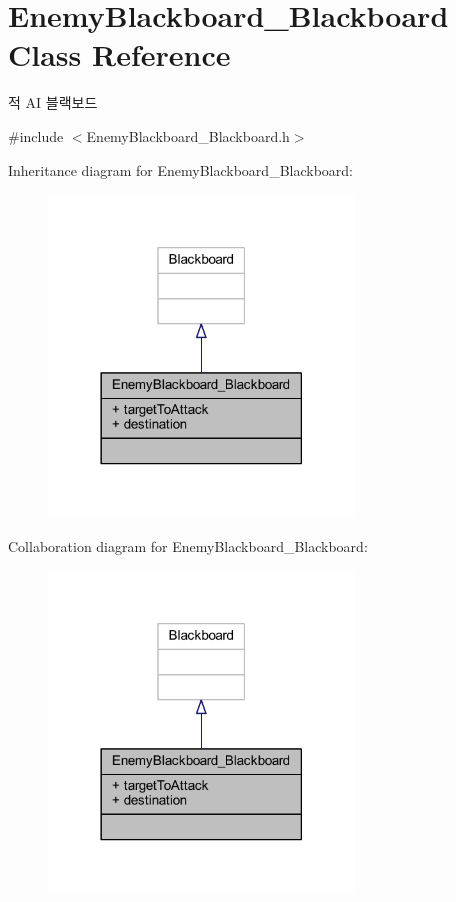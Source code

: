 \hypertarget{class_enemy_blackboard___blackboard}{}\section{Enemy\+Blackboard\+\_\+\+Blackboard Class Reference}
\label{class_enemy_blackboard___blackboard}


적 AI 블랙보드  




{\ttfamily \#include $<$Enemy\+Blackboard\+\_\+\+Blackboard.\+h$>$}



Inheritance diagram for Enemy\+Blackboard\+\_\+\+Blackboard\+:\nopagebreak
\begin{figure}[H]
\begin{center}
\leavevmode
\includegraphics[width=230pt]{class_enemy_blackboard___blackboard__inherit__graph}
\end{center}
\end{figure}


Collaboration diagram for Enemy\+Blackboard\+\_\+\+Blackboard\+:\nopagebreak
\begin{figure}[H]
\begin{center}
\leavevmode
\includegraphics[width=230pt]{class_enemy_blackboard___blackboard__coll__graph}
\end{center}
\end{figure}
